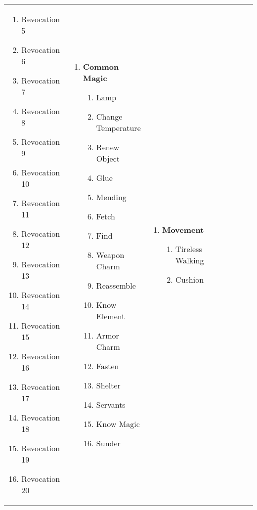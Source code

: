 \begin{tabular}{@{} p{0.25\linewidth} p{0.25\linewidth} p{0.25\linewidth} p{0.25\linewidth}}
\begin{enumerate}
\begin{enumerate}
		\item Revocation 5
		\item Revocation 6
		\item Revocation 7
		\item Revocation 8
		\item Revocation 9
		\item Revocation 10
		\item Revocation 11
		\item Revocation 12
		\item Revocation 13
		\item Revocation 14
		\item Revocation 15
		\item Revocation 16
		\item Revocation 17
		\item Revocation 18
		\item Revocation 19
		\item Revocation 20
	\end{enumerate}
\end{enumerate} &
\begin{enumerate}
	\item \textbf{Common Magic}
	\begin{enumerate}
		\item Lamp
		\item Change Temperature
		\item Renew Object
		\item Glue
		\item Mending
		\item Fetch
		\item Find
		\item Weapon Charm
		\item Reassemble
		\item Know Element
		\item Armor Charm
		\item Fasten
		\item Shelter
		\item Servants
		\item Know Magic
		\item Sunder
	\end{enumerate}
\end{enumerate} &
\begin{enumerate}
	\item \textbf{Movement}
	\begin{enumerate}
		\item Tireless Walking
		\item Cushion

\end{enumerate}
\end{enumerate}
\end{tabular}
